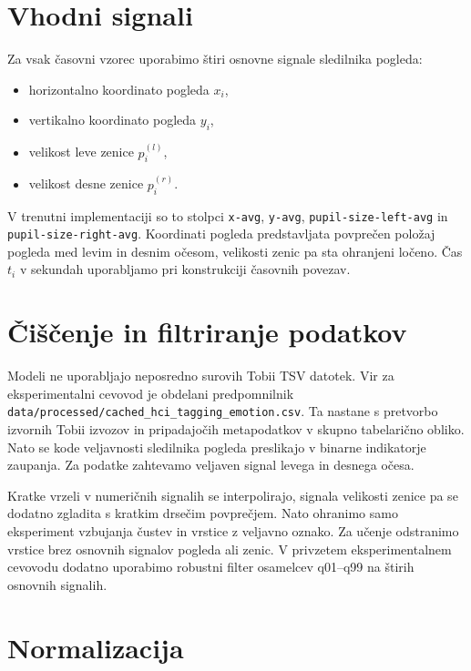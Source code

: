 
\section{Vhodni signali}
\label{subsec:vhodni-signali}

Za vsak časovni vzorec uporabimo štiri osnovne signale sledilnika pogleda:
\begin{itemize}
    \item horizontalno koordinato pogleda $x_i$,
    \item vertikalno koordinato pogleda $y_i$,
    \item velikost leve zenice $p^{(l)}_i$,
    \item velikost desne zenice $p^{(r)}_i$.
\end{itemize}

V trenutni implementaciji so to stolpci \texttt{x-avg}, \texttt{y-avg}, \texttt{pupil-size-left-avg} in \texttt{pupil-size-right-avg}.
Koordinati pogleda predstavljata povprečen položaj pogleda med levim in desnim očesom, velikosti zenic pa sta ohranjeni ločeno.
Čas $t_i$ v sekundah uporabljamo pri konstrukciji časovnih povezav.

\section{Čiščenje in filtriranje podatkov}
\label{subsec:ciscenje}

Modeli ne uporabljajo neposredno surovih Tobii TSV datotek.
Vir za eksperimentalni cevovod je obdelani predpomnilnik \texttt{data/processed/cached\_hci\_tagging\_emotion.csv}.
Ta nastane s pretvorbo izvornih Tobii izvozov in pripadajočih metapodatkov v skupno tabelarično obliko.
Nato se kode veljavnosti sledilnika pogleda preslikajo v binarne indikatorje zaupanja.
Za podatke \MAHNOB{} zahtevamo veljaven signal levega in desnega očesa.

Kratke vrzeli v numeričnih signalih se interpolirajo, signala velikosti zenice pa se dodatno zgladita s kratkim drsečim povprečjem.
Nato ohranimo samo eksperiment vzbujanja čustev in vrstice z veljavno oznako.
Za učenje odstranimo vrstice brez osnovnih signalov pogleda ali zenic.
V privzetem eksperimentalnem cevovodu dodatno uporabimo robustni filter osamelcev q01--q99 na štirih osnovnih signalih.

\section{Normalizacija}
\label{subsec:normalizacija}


